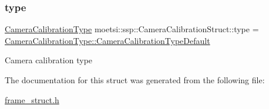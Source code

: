 \subsubsection{\texorpdfstring{type}{type}}
{\footnotesize\ttfamily \hyperlink{namespacemoetsi_1_1ssp_a1f51291db51233dc5865d42e6ee36ef8}{Camera\+Calibration\+Type} moetsi\+::ssp\+::\+Camera\+Calibration\+Struct\+::type = \hyperlink{namespacemoetsi_1_1ssp_a1f51291db51233dc5865d42e6ee36ef8ac32f0bb1b309dd3992d8e37bfaa00c78}{Camera\+Calibration\+Type\+::\+Camera\+Calibration\+Type\+Default}}

Camera calibration type 

The documentation for this struct was generated from the following file\+:\begin{DoxyCompactItemize}
\item 
\hyperlink{frame__struct_8h}{frame\+\_\+struct.\+h}\end{DoxyCompactItemize}
